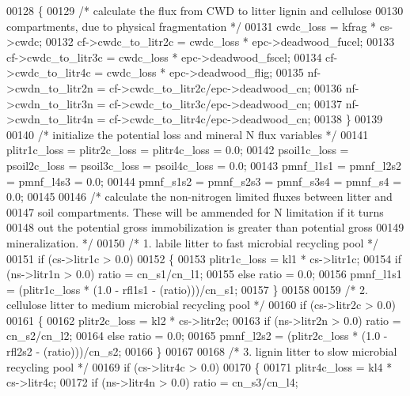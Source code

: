 \begin{DoxyCode}
00128     \{
00129         \textcolor{comment}{/* calculate the flux from CWD to litter lignin and cellulose}
00130 \textcolor{comment}{        compartments, due to physical fragmentation */}
00131         cwdc\_loss = kfrag * cs->cwdc;
00132         cf->cwdc\_to\_litr2c = cwdc\_loss * epc->deadwood\_fucel;
00133         cf->cwdc\_to\_litr3c = cwdc\_loss * epc->deadwood\_fscel;
00134         cf->cwdc\_to\_litr4c = cwdc\_loss * epc->deadwood\_flig;
00135         nf->cwdn\_to\_litr2n = cf->cwdc\_to\_litr2c/epc->deadwood\_cn;
00136         nf->cwdn\_to\_litr3n = cf->cwdc\_to\_litr3c/epc->deadwood\_cn;
00137         nf->cwdn\_to\_litr4n = cf->cwdc\_to\_litr4c/epc->deadwood\_cn;
00138     \}
00139     
00140     \textcolor{comment}{/* initialize the potential loss and mineral N flux variables */}
00141     plitr1c\_loss = plitr2c\_loss = plitr4c\_loss = 0.0;
00142     psoil1c\_loss = psoil2c\_loss = psoil3c\_loss = psoil4c\_loss = 0.0;
00143     pmnf\_l1s1 = pmnf\_l2s2 = pmnf\_l4s3 = 0.0;
00144     pmnf\_s1s2 = pmnf\_s2s3 = pmnf\_s3s4 = pmnf\_s4 = 0.0;
00145     
00146     \textcolor{comment}{/* calculate the non-nitrogen limited fluxes between litter and}
00147 \textcolor{comment}{    soil compartments. These will be ammended for N limitation if it turns}
00148 \textcolor{comment}{    out the potential gross immobilization is greater than potential gross}
00149 \textcolor{comment}{    mineralization. */}
00150     \textcolor{comment}{/* 1. labile litter to fast microbial recycling pool */}
00151     \textcolor{keywordflow}{if} (cs->litr1c > 0.0)
00152     \{
00153         plitr1c\_loss = kl1 * cs->litr1c;
00154         \textcolor{keywordflow}{if} (ns->litr1n > 0.0) ratio = cn\_s1/cn\_l1;
00155         \textcolor{keywordflow}{else} ratio = 0.0;
00156         pmnf\_l1s1 = (plitr1c\_loss * (1.0 - rfl1s1 - (ratio)))/cn\_s1;
00157     \}
00158     
00159     \textcolor{comment}{/* 2. cellulose litter to medium microbial recycling pool */}
00160     \textcolor{keywordflow}{if} (cs->litr2c > 0.0)
00161     \{
00162         plitr2c\_loss = kl2 * cs->litr2c;
00163         \textcolor{keywordflow}{if} (ns->litr2n > 0.0) ratio = cn\_s2/cn\_l2;
00164         \textcolor{keywordflow}{else} ratio = 0.0;
00165         pmnf\_l2s2 = (plitr2c\_loss * (1.0 - rfl2s2 - (ratio)))/cn\_s2;
00166     \}
00167     
00168     \textcolor{comment}{/* 3. lignin litter to slow microbial recycling pool */}
00169     \textcolor{keywordflow}{if} (cs->litr4c > 0.0)
00170     \{
00171         plitr4c\_loss = kl4 * cs->litr4c;
00172         \textcolor{keywordflow}{if} (ns->litr4n > 0.0) ratio = cn\_s3/cn\_l4;

\end{DoxyCode}
